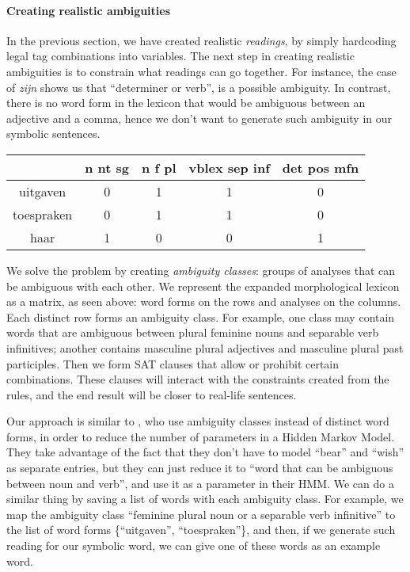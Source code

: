 \paragraph{Creating realistic ambiguities}




In the previous section, we have created realistic \emph{readings}, by simply hardcoding legal tag combinations into variables. The next step in creating realistic ambiguities is to constrain what readings can go together. For instance, the case of \emph{zijn} shows us that ``determiner or verb'', is a possible ambiguity. In contrast, there is no word form in the lexicon that would be ambiguous between an adjective and a comma, hence we don't want to generate such ambiguity in our symbolic sentences.

\begin{center}
\begin{tabular}{c|c|c|c|c}


            & n nt sg  & n f pl  & vblex sep inf & det pos mfn  \\ \hline
uitgaven    & 0        & 1       & 1             & 0    \\ 
toespraken  & 0        & 1       & 1             & 0    \\ 
haar        & 1        & 0       & 0             & 1    \\ 


\end{tabular}
\end{center}

We solve the problem by creating \emph{ambiguity classes}: groups of analyses that can be ambiguous with each other. 
We represent the expanded morphological lexicon as a matrix, as seen
above: word forms on the rows and analyses on the columns. Each
distinct row forms an ambiguity class. For example, one class may
contain words that are ambiguous between plural feminine nouns and
separable verb infinitives; another contains masculine plural adjectives 
and masculine plural past participles.
Then we form SAT clauses that allow or prohibit certain combinations. These clauses will interact with the constraints created from the rules, and the end result will be closer to real-life sentences.

Our approach is similar to , who use ambiguity classes instead of distinct word forms, in order to reduce the number of parameters in a Hidden Markov Model. They take advantage of the fact that they don't have to model ``bear'' and ``wish'' as separate entries, but they can just reduce it to ``word that can be ambiguous between noun and verb'', and use it as a parameter in their HMM. 
We can do a similar thing by saving a list of words with each ambiguity class. For example, we map the ambiguity class ``feminine plural noun or a separable verb infinitive'' to the list of word forms \{``uitgaven'', ``toespraken''\}, and then, if we generate such reading for our symbolic word, we can give one of these words as an example word.

